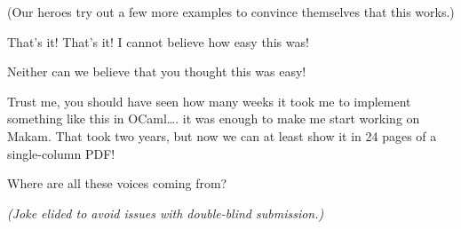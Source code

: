 \begin{scenecomment}
(Our heroes try out a few more examples to convince themselves that this works.)
\end{scenecomment}

\heroSTUDENT{} That's it! That's it! I cannot believe how easy this was!

\heroAUDIENCE{} Neither can we believe that you thought this was easy!

\heroAUTHOR{} Trust me, you should have seen how many weeks it took me to
implement something like this in OCaml\ldots{}. it was enough to make me
start working on Makam. That took two years, but now we can at least
show it in 24 pages of a single-column PDF!

\heroADVISOR{} Where are all these voices coming from?

\heroSTUDENT{}
\textit{(Joke elided to avoid issues with double-blind submission.)}
